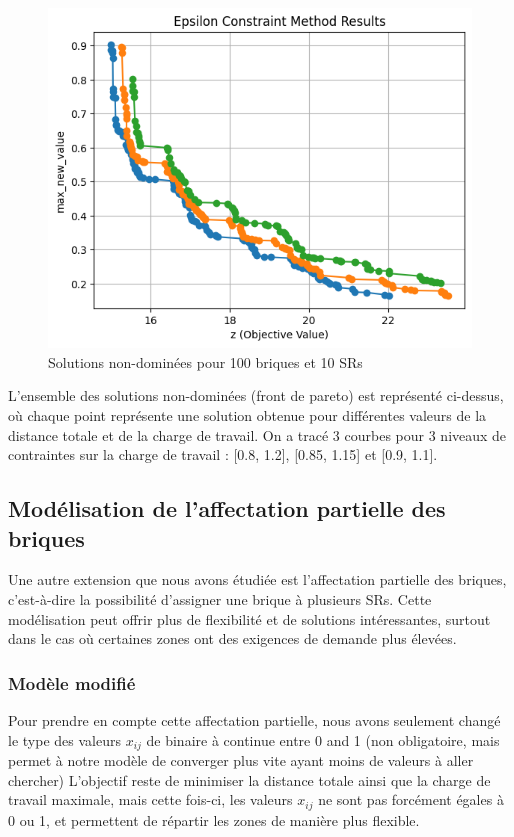 \begin{figure}[H]
    \centering
    \includegraphics[width=\textwidth]{Images/step_2/step_2-min-distance.png}
    \caption{Solutions non-dominées pour 100 briques et 10 SRs}
    \label{fig:solutions_step_2}
\end{figure}

L’ensemble des solutions non-dominées (front de pareto) est représenté ci-dessus, où chaque point représente une solution obtenue pour différentes valeurs de la distance totale et de la charge de travail. On a tracé 3 courbes pour 3 niveaux de contraintes sur la charge de travail : [0.8, 1.2], [0.85, 1.15] et [0.9, 1.1].

\subsection{Modélisation de l'affectation partielle des briques}
Une autre extension que nous avons étudiée est l'affectation partielle des briques, c'est-à-dire la possibilité d'assigner une brique à plusieurs SRs. Cette modélisation peut offrir plus de flexibilité et de solutions intéressantes, surtout dans le cas où certaines zones ont des exigences de demande plus élevées.

\subsubsection{Modèle modifié}
Pour prendre en compte cette affectation partielle, nous avons seulement changé le type des valeurs $x_{ij}$ de binaire à continue entre 0 and 1 (non obligatoire, mais permet à notre modèle de converger plus vite ayant moins de valeurs à aller chercher)
L'objectif reste de minimiser la distance totale ainsi que la charge de travail maximale, mais cette fois-ci, les valeurs $x_{ij}$ ne sont pas forcément égales à 0 ou 1, et permettent de répartir les zones de manière plus flexible.

